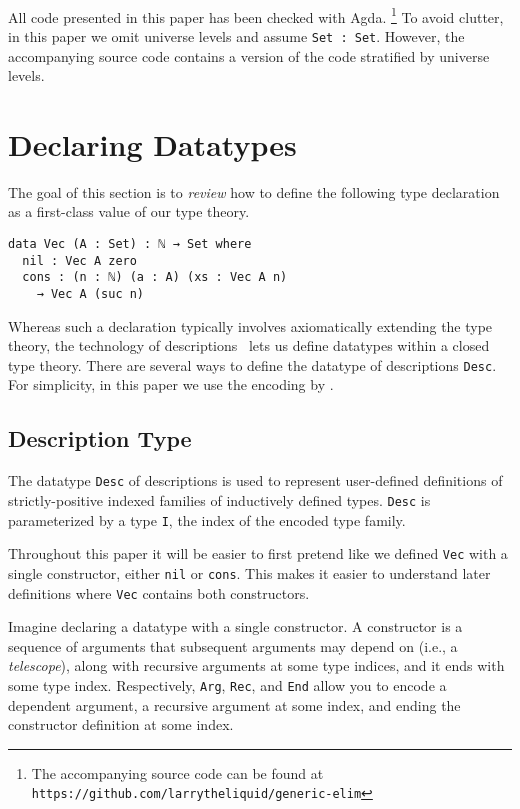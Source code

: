 \documentclass[nonatbib]{sigplanconf}
\begin{document}
\paragraph{}
All code presented in this paper has been checked with {\sc Agda}.
\footnote{\raggedright{The accompanying source code can be found at
{\tt https://github.com/larrytheliquid/generic-elim}}}
To avoid clutter, in this paper we omit universe levels and assume
{\tt Set : Set}. However, the accompanying source code contains a
version of the code stratified by universe levels.

\section{Declaring Datatypes}
\label{sec:background}

The goal of this section is to {\it review} how to define the following type
declaration as a first-class value of our type theory. 

\begin{verbatim}
data Vec (A : Set) : ℕ → Set where
  nil : Vec A zero
  cons : (n : ℕ) (a : A) (xs : Vec A n)
    → Vec A (suc n)
\end{verbatim}

Whereas such a declaration typically involves axiomatically extending
the type theory, the technology of
descriptions~\citep{Chapman:2010:GAL:1932681.1863547,mcbride2010ornamental,dagand:phd}
lets us define datatypes within a closed type theory.
There are
several ways to define the datatype of descriptions {\tt Desc}. 
For simplicity, in this paper we use the encoding by
\citet{mcbride2010ornamental}.

\subsection{Description Type}

The datatype {\tt Desc} of descriptions is used to represent
user-defined definitions of strictly-positive indexed
families of inductively defined types.
{\tt Desc} is parameterized by 
a type {\tt I}, the index of the encoded type family.

Throughout this paper it will be easier to first pretend like we
defined {\tt Vec} with a single constructor, either
{\tt nil} or {\tt cons}. This makes it easier to understand
later definitions where {\tt Vec} contains both constructors.

Imagine declaring a datatype with a single constructor.
A constructor is a sequence of
arguments that subsequent arguments may depend on (i.e., a {\it telescope}), along with
recursive arguments at some type indices, and it ends with some type index.
Respectively, {\tt Arg}, {\tt Rec}, and {\tt End} allow you to encode
a dependent argument, a recursive argument at some index, and ending the
constructor definition at some index.
\end{document}
